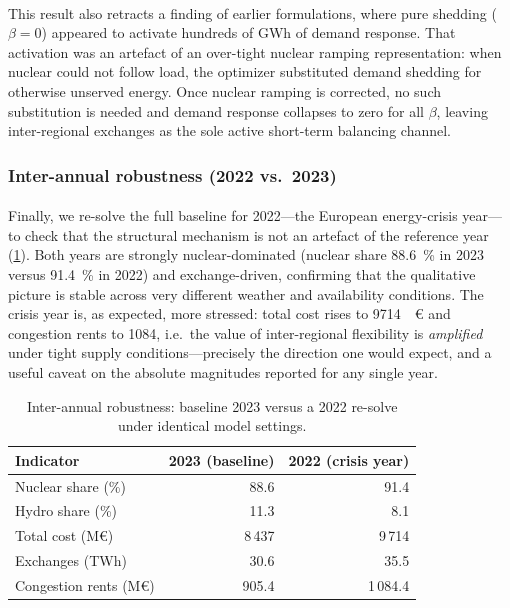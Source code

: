 \documentclass[12pt]{article}
\newcommand{\EURM}[1]{\SI{#1}{\mega\euro}} %
\begin{document}
\paragraph{}
This result also retracts a finding of earlier formulations, where pure shedding ($\beta=0$) appeared to activate hundreds of GWh of demand response. That activation was an artefact of an over-tight nuclear ramping representation: when nuclear could not follow load, the optimizer substituted demand shedding for otherwise unserved energy. Once nuclear ramping is corrected, no such substitution is needed and demand response collapses to zero for all $\beta$, leaving inter-regional exchanges as the sole active short-term balancing channel.

\subsubsection{Inter-annual robustness (2022 vs.\ 2023)}
\label{subsec:robust_interannual}

\paragraph{}
Finally, we re-solve the full baseline for 2022---the European energy-crisis year---to check that the structural mechanism is not an artefact of the reference year (\cref{tab:robust_interannual}). Both years are strongly nuclear-dominated (nuclear share \SI{88.6}{\percent} in 2023 versus \SI{91.4}{\percent} in 2022) and exchange-driven, confirming that the qualitative picture is stable across very different weather and availability conditions. The crisis year is, as expected, more stressed: total cost rises to \EURM{9714} and congestion rents to \SI{1084}{\MEUR}, i.e.\ the value of inter-regional flexibility is \emph{amplified} under tight supply conditions---precisely the direction one would expect, and a useful caveat on the absolute magnitudes reported for any single year.

\begin{table}[H]
  \centering
  \begin{tabular}{lrr}
  \hline
  Indicator & 2023 (baseline) & 2022 (crisis year) \\
  \hline
  Nuclear share (\%)     & 88.6 & 91.4 \\
  Hydro share (\%)       & 11.3 & 8.1  \\
  Total cost (M€)        & 8\,437 & 9\,714 \\
  Exchanges (TWh)        & 30.6 & 35.5 \\
  Congestion rents (M€)  & 905.4 & 1\,084.4 \\
  \hline
  \end{tabular}
  \caption{Inter-annual robustness: baseline 2023 versus a 2022 re-solve under identical model settings.}
  \label{tab:robust_interannual}
\end{table}
\end{document}
